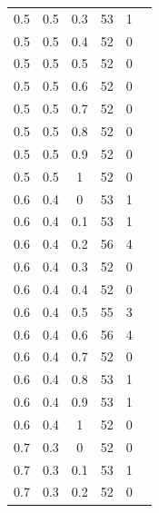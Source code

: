 \documentclass[12pt]{report}
\begin{document}
\begin{table}
\begin{minipage}[!h]{0.50\hsize}
\begin{center}
{\begin{tabular}{|c@{\hspace{5mm}}|c@{\hspace{5mm}}|c@{\hspace{5mm}}|c@{\hspace{5mm}}|c@{\hspace{5mm}}|c|}
                    0.5  & 0.5  & 0.3  & 53    & 1     \\
                    0.5  & 0.5  & 0.4  & 52    & 0     \\
                    0.5  & 0.5  & 0.5  & 52    & 0     \\
                    0.5  & 0.5  & 0.6  & 52    & 0     \\
                    0.5  & 0.5  & 0.7  & 52    & 0     \\
                    0.5  & 0.5  & 0.8  & 52    & 0     \\
                    0.5  & 0.5  & 0.9  & 52    & 0     \\
                    0.5  & 0.5  & 1    & 52    & 0     \\
                    0.6  & 0.4  & 0    & 53    & 1     \\
                    0.6  & 0.4  & 0.1  & 53    & 1     \\
                    0.6  & 0.4  & 0.2  & 56    & 4     \\
                    0.6  & 0.4  & 0.3  & 52    & 0     \\
                    0.6  & 0.4  & 0.4  & 52    & 0     \\
                    0.6  & 0.4  & 0.5  & 55    & 3     \\
                    0.6  & 0.4  & 0.6  & 56    & 4     \\
                    0.6  & 0.4  & 0.7  & 52    & 0     \\
                    0.6  & 0.4  & 0.8  & 53    & 1     \\
                    0.6  & 0.4  & 0.9  & 53    & 1     \\
                    0.6  & 0.4  & 1    & 52    & 0     \\
                    0.7  & 0.3  & 0    & 52    & 0     \\
                    0.7  & 0.3  & 0.1  & 53    & 1     \\
                    0.7  & 0.3  & 0.2  & 52    & 0     \\
                \end{tabular}}
        \end{center}
    \end{minipage}
\end{table}
\clearpage
\end{document}
